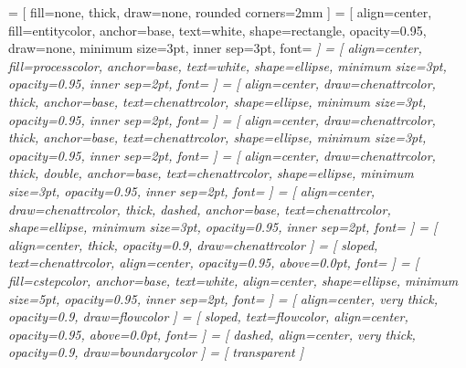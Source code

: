 \usepackage{tikz}
\usetikzlibrary{automata}
\usetikzlibrary{arrows}
\usetikzlibrary{backgrounds}
\usetikzlibrary{decorations.text}
\usetikzlibrary{decorations.markings}
\usetikzlibrary{fit}
\usetikzlibrary{graphs}
\usetikzlibrary{shapes.geometric}
     = [
      fill=none,
      thick,
      draw=none,
      rounded corners=2mm
    ]
     = [
      align=center,
      fill=entitycolor,
      anchor=base,
      text=white,
      shape=rectangle,
      opacity=0.95,
      draw=none,
      minimum size=3pt,
      inner sep=3pt,
      font=\sffamily\slshape\small
    ]
     = [
      align=center,
      fill=processcolor,
      anchor=base,
      text=white,
      shape=ellipse,
      minimum size=3pt,
      opacity=0.95,
      inner sep=2pt,
      font=\sffamily\small\slshape
    ]
     = [
      align=center,
      draw=chenattrcolor,
      thick,
      anchor=base,
      text=chenattrcolor,
      shape=ellipse,
      minimum size=3pt,
      opacity=0.95,
      inner sep=2pt,
      font=\ttfamily\small
    ]
     = [
      align=center,
      draw=chenattrcolor,
      thick,
      anchor=base,
      text=chenattrcolor,
      shape=ellipse,
      minimum size=3pt,
      opacity=0.95,
      inner sep=2pt,
      font=\ttfamily\footnotesize
    ]
     = [
      align=center,
      draw=chenattrcolor,
      thick,
      double,
      anchor=base,
      text=chenattrcolor,
      shape=ellipse,
      minimum size=3pt,
      opacity=0.95,
      inner sep=2pt,
      font=\ttfamily\small
    ]
     = [
      align=center,
      draw=chenattrcolor,
      thick,
      dashed,
      anchor=base,
      text=chenattrcolor,
      shape=ellipse,
      minimum size=3pt,
      opacity=0.95,
      inner sep=2pt,
      font=\ttfamily\small
    ]
     = [
      align=center,
      thick,
      opacity=0.9,
      draw=chenattrcolor
    ]
     = [
      sloped,
      text=chenattrcolor,
      align=center,
      opacity=0.95,
      above=0.0pt,
      font=\ttfamily\small
    ]
     = [
      fill=cstepcolor,
      anchor=base,
      text=white,
      align=center,
      shape=ellipse,
      minimum size=5pt,
      opacity=0.95,
      inner sep=2pt,
      font=\sffamily\scriptsize\itshape
    ]
     = [
      align=center,
      very thick,
      opacity=0.9,
      draw=flowcolor
    ]
     = [
      sloped,
      text=flowcolor,
      align=center,
      opacity=0.95,
      above=0.0pt,
      font=\sffamily\footnotesize\slshape
    ]
     = [
      dashed,
      align=center,
      very thick,
      opacity=0.9,
      draw=boundarycolor
    ]
     = [
      transparent
    ]



